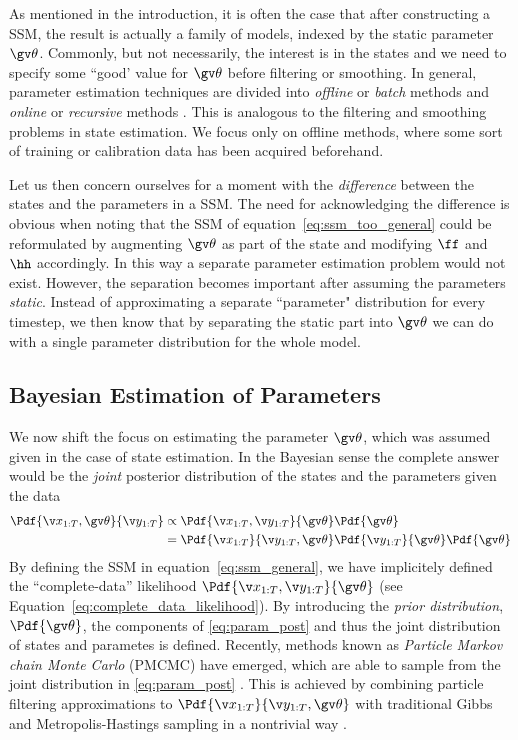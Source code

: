 
As mentioned in the introduction, it is often the case that
after constructing a SSM, the result is actually a family of models,
indexed by the static parameter $\Th$. Commonly, but not necessarily, the interest
is in the states and we need to specify some ``good' value for $\Th$ before
filtering or smoothing. In general, parameter estimation techniques are divided
into \emph{offline} or \emph{batch} methods and \emph{online} or \emph{recursive} methods
\parencite{Cappe2007}. 
This is analogous to the filtering and smoothing problems in state estimation.
We focus only on offline methods, where some sort of training or calibration data has been
acquired beforehand.

Let us then concern ourselves for a moment with the \emph{difference} between the states
and the parameters in a SSM.
The need for acknowledging the difference is obvious when noting that the SSM of equation~\eqref{eq:ssm_too_general}
could be reformulated by augmenting $\Th$ as part of the state and
modifying $\ff$ and $\hh$ accordingly. In this
way a separate parameter estimation problem would not exist. However, the 
separation becomes important after assuming the parameters \emph{static}. Instead of 
approximating a separate ``parameter" distribution for every
timestep, we then know that by separating the static part into
$\Th$ we can do with a single parameter distribution for the whole model. 


\subsection{Bayesian Estimation of Parameters}%
We now shift the focus on estimating the parameter $\Th$, which was assumed
given in the case of state estimation. In the Bayesian sense the complete 
answer would be the \emph{joint} posterior distribution of the states and the parameters given the data 
\begin{align}
	\Pdf{\X,\Th}{\Y} &\propto \Pdf{\X,\Y}{\Th}\Pdf{\Th}\\
	&= \Pdf{\X}{\Y,\Th}\Pdf{\Y}{\Th}\Pdf{\Th}
	\label{eq:param_post}
\end{align}
By defining the SSM in equation~\eqref{eq:ssm_general}, we have
implicitely defined the ``complete-data'' likelihood $\Pdf{\X,\Y}{\Th}$
(see Equation~\eqref{eq:complete_data_likelihood}).
By introducing the \emph{prior distribution}, $\Pdf{\Th}$,
the components of \eqref{eq:param_post} and thus the joint distribution
of states and parametes is defined. Recently, methods known as
\emph{Particle Markov chain Monte Carlo} (PMCMC) have emerged,
which are able to sample from the joint distribution in \eqref{eq:param_post}
\parencite{Andrieu2010}.
This is achieved by combining particle filtering approximations to $\Pdf{\X}{\Y,\Th}$ 
with traditional Gibbs and Metropolis-Hastings sampling in a nontrivial way \parencite{gelman2004}.

